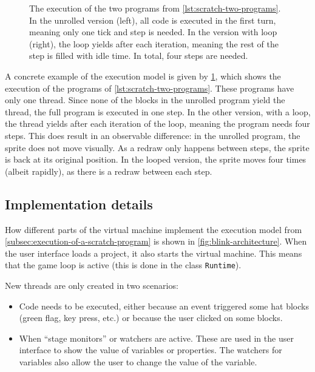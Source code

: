 \documentclass[../main]{subfiles}
\begin{document}
\begin{figure}
    \centering
    \begin{subfigure}{0.40\textwidth}
        
    \end{subfigure}
    \begin{subfigure}{0.59\textwidth}
        
    \end{subfigure}
    \caption{The execution of the two programs from \cref{lst:scratch-two-programs}. In the unrolled version (left), all code is executed in the first turn, meaning only one tick and step is needed. In the version with loop (right), the loop yields after each iteration, meaning the rest of the step is filled with idle time. In total, four steps are needed. }
    \label{fig:scratch-two-execution}
\end{figure}

A concrete example of the execution model is given by \cref{fig:scratch-two-execution}, which shows the execution of the programs of \cref{lst:scratch-two-programs}.
These programs have only one thread.
Since none of the blocks in the unrolled program yield the thread, the full program is executed in one step.
In the other version, with a loop, the thread yields after each iteration of the loop, meaning the program needs four steps.
This does result in an observable difference: in the unrolled program, the sprite does not move visually.
As a redraw only happens between steps, the sprite is back at its original position.
In the looped version, the sprite moves four times (albeit rapidly), as there is a redraw between each step.

\subsection{Implementation details}\label{subsec:implementation-details}

How different parts of the virtual machine implement the execution model from \cref{subsec:execution-of-a-scratch-program} is shown in \cref{fig:blink-architecture}.
When the user interface loads a project, it also starts the virtual machine.
This means that the game loop is active (this is done in the class \texttt{Runtime}).

New threads are only created in two scenarios:
\begin{itemize}[noitemsep]
    \item Code needs to be executed, either because an event triggered some hat blocks (green flag, key press, etc.) or because the user clicked on some blocks.
    \item When ``stage monitors'' or watchers are active.
        These are used in the user interface to show the value of variables or properties.
        The watchers for variables also allow the user to change the value of the variable.
\end{itemize}
\end{document}
